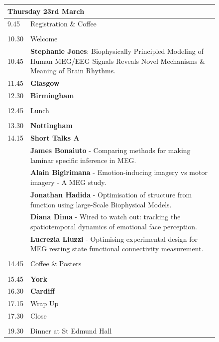 \documentclass[12pt,a4paper]{article}
\begin{document}
\begin{figure}[h]
\centering
\begin{tabularx}{.95\textwidth}{l p{.8\linewidth}}
\multicolumn{2}{l}{\Large Thursday 23rd March}\\
\toprule
9.45 & Registration \& Coffee \\
\\
10.30 & Welcome \\
10.45 & {\bf Stephanie Jones}: {\small Biophysically Principled Modeling of Human MEG/EEG Signals Reveals Novel Mechanisms \& Meaning of Brain Rhythms.}  \\
11.45 & {\bf Glasgow} \\
12.30 & {\bf Birmingham} \\
\\
12.45 & Lunch  \\
\\
13.30 & {\bf Nottingham} \\
14.15 & {\bf Short Talks A} \vspace{.25cm}\\
& \hspace{.5cm} \parbox{.75\textwidth}{\raggedright\small {\bf James Bonaiuto} - Comparing methods for making laminar specific inference in MEG.}\vspace{.25cm}\\
& \hspace{.5cm} \parbox{.75\textwidth}{\raggedright\small {\bf Alain Bigirimana} - Emotion-inducing imagery vs motor imagery - A MEG study.}\vspace{.25cm}\\
& \hspace{.5cm} \parbox{.75\textwidth}{\raggedright\small {\bf Jonathan Hadida} - Optimisation of structure from function using large-Scale Biophysical Models.}\vspace{.25cm}\\
& \hspace{.5cm} \parbox{.75\textwidth}{\raggedright\small {\bf Diana Dima} - Wired to watch out: tracking the spatiotemporal dynamics of emotional face perception.}\vspace{.25cm}\\
& \hspace{.5cm} \parbox{.75\textwidth}{\raggedright\small {\bf Lucrezia Liuzzi} - Optimising experimental design for MEG resting state functional connectivity measurement.}\vspace{.25cm}
\\
\\
14.45 & Coffee \& Posters \\
\\
15.45 & {\bf York} \\
16.30 & {\bf Cardiff} \\
17.15 & Wrap Up \\
17.30 & Close\\
\\
19.30 & Dinner at St Edmund Hall\\
\bottomrule
\end{tabularx}
\end{figure}
\end{document}
